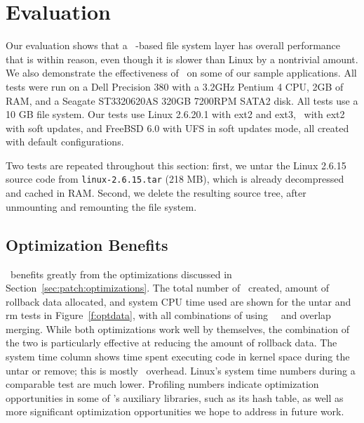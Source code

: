 \section {Evaluation}
\label{sec:evaluation}

Our evaluation shows that a \Kudos\ \patch-based file system layer has
overall performance that is within reason, even though it is slower than
Linux by a nontrivial amount.  We also demonstrate the effectiveness of
\patchgroups\ on some of our sample applications. All tests were run on a Dell
Precision 380 with a 3.2GHz Pentium 4 CPU, 2GB of RAM, and a Seagate
ST3320620AS 320GB 7200RPM SATA2 disk.
%
All tests use a 10 GB file system.
%
Our tests use Linux 2.6.20.1 with ext2 and ext3, \Kudos\ with ext2 with
soft updates, and FreeBSD 6.0 with UFS in soft updates mode, all created
with default configurations.

Two tests are repeated throughout this section: first, we untar
the Linux 2.6.15 source code from \texttt{linux-2.6.15.tar} (218 MB), which is
already decompressed and cached in RAM. Second, we delete the resulting source
tree, after unmounting and remounting the file system.

\subsection {Optimization Benefits}

\Kudos\ benefits greatly from the optimizations discussed in
Section~\ref{sec:patch:optimizations}. The total number of \patches\ created,
amount of rollback data allocated, and system CPU time used are shown for the
untar and rm tests in Figure~\ref{f:optdata}, with all combinations of using
\nrb\ \patches\ and overlap merging. While both optimizations work well by
themselves, the combination of the two is particularly effective at reducing the
amount of rollback data.
%
The system time column shows time spent executing code in kernel space
during the untar or remove; this is mostly \Kudos\ overhead.  Linux's
system time numbers during a comparable test are much lower.  Profiling
numbers indicate optimization opportunities in some of \Kudos's auxiliary
libraries, such as its hash table, as well as more significant optimization
opportunities we hope to address in future work.


